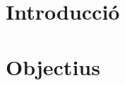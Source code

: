 \documentclass[a4paper,12pt]{book}
\renewcommand{\headrulewidth}{0pt}
\begin{document}


\frontmatter

\cleardoublepage

% 

\cleardoublepage
\setcounter{tocdepth}{2}
\renewcommand\contentsname{Índex de continguts}
\tableofcontents
\label{i:tableofcontents}

\mainmatter
\pagestyle{fancy}
\fancyhf{}
\fancyhead[LE,RO]{\leftmark}
\fancyfoot[LE,RO]{\thepage}
\renewcommand{\headrulewidth}{2pt}
\renewcommand{\footrulewidth}{1pt}

% 
\chapter{Introducció}


% 
\chapter{Objectius}

%
% 
%
% 
%
% 
%
% 
%
% 
%





\appendix
% 
%
% 
%
% 






\label{b:bibliography}

\end{document}
